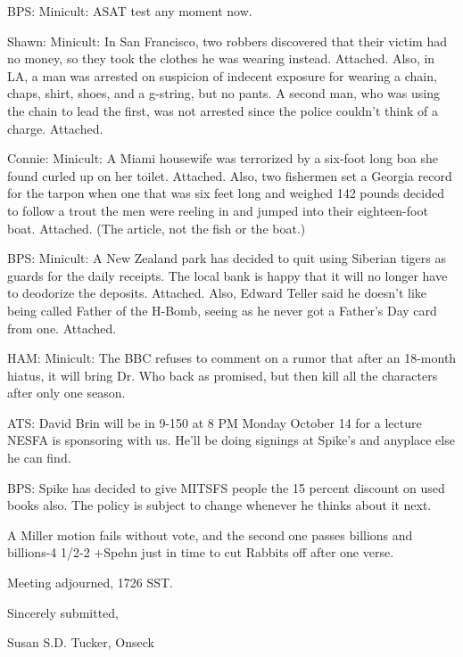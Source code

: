 \documentclass[12pt]{article}
\begin{document}
BPS: Minicult: ASAT test any moment now.

Shawn: Minicult: In San Francisco, two robbers discovered that their victim had no money, so they took the clothes he was wearing instead. Attached. Also, in LA, a man was arrested on suspicion of indecent exposure for wearing a chain, chaps, shirt, shoes, and a g-string, but no pants. A second man, who was using the chain to lead the first, was not arrested since the police couldn't think of a charge. Attached.

Connie: Minicult: A Miami housewife was terrorized by a six-foot long boa she found curled up on her toilet. Attached. Also, two fishermen set a Georgia record for the tarpon when one that was six feet long and weighed 142 pounds decided to follow a trout the men were reeling in and jumped into their eighteen-foot boat. Attached. (The article, not the fish or the boat.)

BPS: Minicult: A New Zealand park has decided to quit using Siberian tigers as guards for the daily receipts. The local bank is happy that it will no longer have to deodorize the deposits. Attached. Also, Edward Teller said he doesn't like being called Father of the H-Bomb, seeing as he never got a Father's Day card from one. Attached.

HAM: Minicult: The BBC refuses to comment on a rumor that after an 18-month hiatus, it will bring Dr. Who back as promised, but then kill all the characters after only one season.

ATS: David Brin will be in 9-150 at 8 PM Monday October 14 for a lecture NESFA is sponsoring with us. He'll be doing signings at Spike's and anyplace else he can find.

BPS: Spike has decided to give MITSFS people the 15 percent discount on used books also. The policy is subject to change whenever he thinks about it next.

A Miller motion fails without vote, and the second one passes billions and billions-4 1/2-2 +Spehn just in time to cut Rabbits off after one verse.

\vspace{12pt}

\noindent
Meeting adjourned, 1726 SST.

\vspace{18pt}

\centerline{Sincerely submitted,}
\centerline{Susan S.D. Tucker, Onseck}
\end{document}
